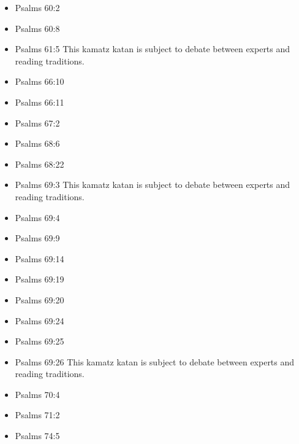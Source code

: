 \documentclass[14pt]{article}
\begin{document}
\begin{multicols}{2}
\begin{itemize}
\item Psalms 60:2

\item Psalms 60:8

\item Psalms 61:5 This kamatz katan is subject to debate between experts and reading traditions.

\item Psalms 66:10

\item Psalms 66:11

\item Psalms 67:2

\item Psalms 68:6

\item Psalms 68:22

\item Psalms 69:3 This kamatz katan is subject to debate between experts and reading traditions.

\item Psalms 69:4
	
	\item Psalms 69:9
	
	\item Psalms 69:14
	
	\item Psalms 69:19
	
	\item Psalms 69:20
	
	\item Psalms 69:24
	
	\item Psalms 69:25
	
	\item Psalms 69:26 This kamatz katan is subject to debate between experts and reading traditions.
	
	\item Psalms 70:4
	
	
	\item Psalms 71:2
	
	\item Psalms 74:5
			

\end{itemize}
\end{multicols}
\end{document}
